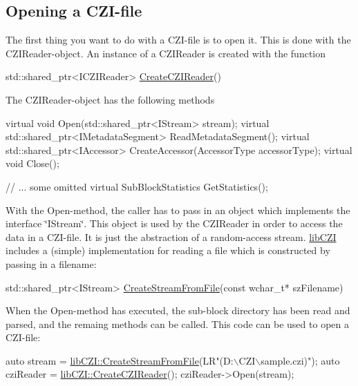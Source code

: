 \subsection*{Opening a C\+Z\+I-\/file}

The first thing you want to do with a C\+Z\+I-\/file is to open it. This is done with the C\+Z\+I\+Reader-\/object. An instance of a C\+Z\+I\+Reader is created with the function


\begin{DoxyCode}
std::shared\_ptr<ICZIReader> \hyperlink{namespacelib_c_z_i_abe978d8bd50abe94c2d37df6212859e8}{CreateCZIReader}()
\end{DoxyCode}


The C\+Z\+I\+Reader-\/object has the following methods


\begin{DoxyCode}
\textcolor{keyword}{virtual} \textcolor{keywordtype}{void} Open(std::shared\_ptr<IStream> stream);
\textcolor{keyword}{virtual} std::shared\_ptr<IMetadataSegment> ReadMetadataSegment();
\textcolor{keyword}{virtual} std::shared\_ptr<IAccessor> CreateAccessor(AccessorType accessorType);
\textcolor{keyword}{virtual} \textcolor{keywordtype}{void} Close();

\textcolor{comment}{// ... some omitted}
\textcolor{keyword}{virtual} SubBlockStatistics GetStatistics();
\end{DoxyCode}


With the Open-\/method, the caller has to pass in an object which implements the interface \char`\"{}\+I\+Stream\char`\"{}. This object is used by the C\+Z\+I\+Reader in order to access the data in a C\+Z\+I-\/file. It is just the abstraction of a random-\/access stream. \hyperlink{namespacelib_c_z_i}{lib\+C\+ZI} includes a (simple) implementation for reading a file which is constructed by passing in a filename\+:


\begin{DoxyCode}
std::shared\_ptr<IStream> \hyperlink{namespacelib_c_z_i_a8783cf40c0eac418632db90c4f20b43b}{CreateStreamFromFile}(\textcolor{keyword}{const} \textcolor{keywordtype}{wchar\_t}* szFilename)
\end{DoxyCode}


When the Open-\/method has executed, the sub-\/block directory has been read and parsed, and the remaing methods can be called. This code can be used to open a C\+Z\+I-\/file\+:


\begin{DoxyCode}
\textcolor{keyword}{auto} stream = \hyperlink{namespacelib_c_z_i_a8783cf40c0eac418632db90c4f20b43b}{libCZI::CreateStreamFromFile}(LR\textcolor{stringliteral}{"(D:\(\backslash\)CZI\(\backslash\)sample.czi)");}
\textcolor{stringliteral}{}\textcolor{keyword}{auto} cziReader = \hyperlink{namespacelib_c_z_i_abe978d8bd50abe94c2d37df6212859e8}{libCZI::CreateCZIReader}();
cziReader->Open(stream); 
\end{DoxyCode}



